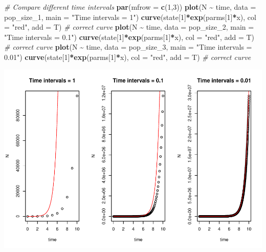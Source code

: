 \documentclass[
]{book}
\newenvironment{Shaded}{\begin{snugshade}}{\end{snugshade}}
\newcommand{\AttributeTok}[1]{\textcolor[rgb]{0.13,0.29,0.53}{#1}}
\newcommand{\CommentTok}[1]{\textcolor[rgb]{0.56,0.35,0.01}{\textit{#1}}}
\newcommand{\DecValTok}[1]{\textcolor[rgb]{0.00,0.00,0.81}{#1}}
\newcommand{\FunctionTok}[1]{\textcolor[rgb]{0.13,0.29,0.53}{\textbf{#1}}}
\newcommand{\NormalTok}[1]{#1}
\newcommand{\SpecialCharTok}[1]{\textcolor[rgb]{0.81,0.36,0.00}{\textbf{#1}}}
\newcommand{\StringTok}[1]{\textcolor[rgb]{0.31,0.60,0.02}{#1}}
\begin{document}
\begin{Shaded}
\begin{Highlighting}[]
\CommentTok{\# Compare different time intervals}
\FunctionTok{par}\NormalTok{(}\AttributeTok{mfrow =} \FunctionTok{c}\NormalTok{(}\DecValTok{1}\NormalTok{,}\DecValTok{3}\NormalTok{))}
\FunctionTok{plot}\NormalTok{(N }\SpecialCharTok{\textasciitilde{}}\NormalTok{ time, }\AttributeTok{data =}\NormalTok{ pop\_size\_1, }\AttributeTok{main =} \StringTok{"Time intervals = 1"}\NormalTok{)}
\FunctionTok{curve}\NormalTok{(state[}\DecValTok{1}\NormalTok{]}\SpecialCharTok{*}\FunctionTok{exp}\NormalTok{(parms[}\DecValTok{1}\NormalTok{]}\SpecialCharTok{*}\NormalTok{x), }\AttributeTok{col =} \StringTok{"red"}\NormalTok{, }\AttributeTok{add =}\NormalTok{ T) }\CommentTok{\# correct curve}
\FunctionTok{plot}\NormalTok{(N }\SpecialCharTok{\textasciitilde{}}\NormalTok{ time, }\AttributeTok{data =}\NormalTok{ pop\_size\_2, }\AttributeTok{main =} \StringTok{"Time intervals = 0.1"}\NormalTok{)}
\FunctionTok{curve}\NormalTok{(state[}\DecValTok{1}\NormalTok{]}\SpecialCharTok{*}\FunctionTok{exp}\NormalTok{(parms[}\DecValTok{1}\NormalTok{]}\SpecialCharTok{*}\NormalTok{x), }\AttributeTok{col =} \StringTok{"red"}\NormalTok{, }\AttributeTok{add =}\NormalTok{ T) }\CommentTok{\# correct curve}
\FunctionTok{plot}\NormalTok{(N }\SpecialCharTok{\textasciitilde{}}\NormalTok{ time, }\AttributeTok{data =}\NormalTok{ pop\_size\_3, }\AttributeTok{main =} \StringTok{"Time intervals = 0.01"}\NormalTok{)}
\FunctionTok{curve}\NormalTok{(state[}\DecValTok{1}\NormalTok{]}\SpecialCharTok{*}\FunctionTok{exp}\NormalTok{(parms[}\DecValTok{1}\NormalTok{]}\SpecialCharTok{*}\NormalTok{x), }\AttributeTok{col =} \StringTok{"red"}\NormalTok{, }\AttributeTok{add =}\NormalTok{ T) }\CommentTok{\# correct curve}
\end{Highlighting}
\end{Shaded}

\includegraphics{bookdown-demo_files/figure-latex/unnamed-chunk-7-2.pdf}
\end{document}
